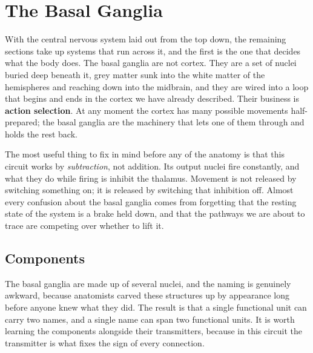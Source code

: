 \documentclass[11pt]{article}
\begin{document}
\section{The Basal Ganglia}

With the central nervous system laid out from the top down, the remaining sections take up systems that run across it, and the first is the one that decides what the body does. The basal ganglia are not cortex. They are a set of nuclei buried deep beneath it, grey matter sunk into the white matter of the hemispheres and reaching down into the midbrain, and they are wired into a loop that begins and ends in the cortex we have already described. Their business is \textbf{action selection}. At any moment the cortex has many possible movements half-prepared; the basal ganglia are the machinery that lets one of them through and holds the rest back.

The most useful thing to fix in mind before any of the anatomy is that this circuit works by \textit{subtraction}, not addition. Its output nuclei fire constantly, and what they do while firing is inhibit the thalamus. Movement is not released by switching something on; it is released by switching that inhibition off. Almost every confusion about the basal ganglia comes from forgetting that the resting state of the system is a brake held down, and that the pathways we are about to trace are competing over whether to lift it.

\subsection{Components}

The basal ganglia are made up of several nuclei, and the naming is genuinely awkward, because anatomists carved these structures up by appearance long before anyone knew what they did. The result is that a single functional unit can carry two names, and a single name can span two functional units. It is worth learning the components alongside their transmitters, because in this circuit the transmitter is what fixes the sign of every connection.
\end{document}

